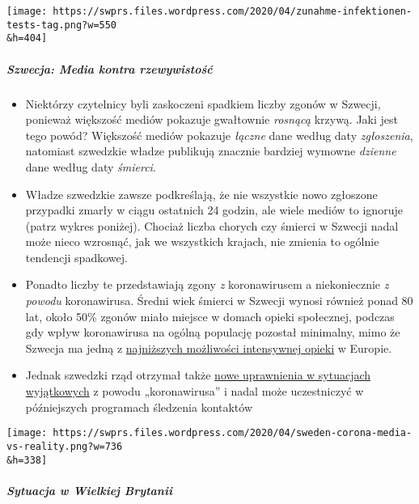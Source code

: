 \texttt{[image: https://swprs.files.wordpress.com/2020/04/zunahme-infektionen-tests-tag.png?w=550\\\&h=404]}

\hypertarget{szwecja-media-kontra-rzewywistoux15bux107}{%
\subparagraph{\texorpdfstring{\textbf{Szwecja: Media kontra
rzewywistość}}{Szwecja: Media kontra rzewywistość}}\label{szwecja-media-kontra-rzewywistoux15bux107}}

\begin{itemize}
\tightlist
\item
  Niektórzy czytelnicy byli zaskoczeni spadkiem liczby zgonów w Szwecji,
  ponieważ większość mediów pokazuje gwałtownie \emph{rosnącą} krzywą.
  Jaki jest tego powód? Większość mediów pokazuje \emph{łączne} dane
  według daty \emph{zgłoszenia}, natomiast szwedzkie władze publikują
  znacznie bardziej wymowne \emph{dzienne} dane według daty
  \emph{śmierci}.
\item
  Władze szwedzkie zawsze podkreślają, że nie wszystkie nowo zgłoszone
  przypadki zmarły w ciągu ostatnich 24 godzin, ale wiele mediów to
  ignoruje (patrz wykres poniżej). Chociaż liczba chorych czy śmierci w
  Szwecji nadal może nieco wzrosnąć, jak we wszystkich krajach, nie
  zmienia to ogólnie tendencji spadkowej.
\item
  Ponadto liczby te przedstawiają zgony \emph{z} koronawirusem a
  niekoniecznie \emph{z powodu} koronawirusa. Średni wiek śmierci w
  Szwecji wynosi również ponad 80 lat, około 50\% zgonów miało miejsce w
  domach opieki społecznej, podczas gdy wpływ koronawirusa na ogólną
  populację pozostał minimalny, mimo że Szwecja ma jedną z
  \href{https://link.springer.com/article/10.1007/s00134-012-2627-8}{najniższych
  możliwości intensywnej opieki} w Europie.
\item
  Jednak szwedzki rząd otrzymał także
  \href{https://www.tagesschau.de/faktenfinder/ausland/corona-kursaenderung-schweden-103.html}{nowe
  uprawnienia w sytuacjach wyjątkowych} z powodu „koronawirusa'' i nadal
  może uczestniczyć w późniejszych programach śledzenia kontaktów
\end{itemize}

\texttt{[image: https://swprs.files.wordpress.com/2020/04/sweden-corona-media-vs-reality.png?w=736\\\&h=338]}

\hypertarget{sytuacja-w-wielkiej-brytanii}{%
\subparagraph{\texorpdfstring{\textbf{Sytuacja w Wielkiej
Brytanii}}{Sytuacja w Wielkiej Brytanii}}\label{sytuacja-w-wielkiej-brytanii}}

